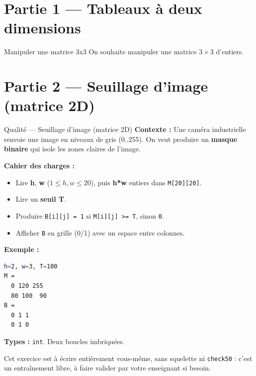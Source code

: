 \section*{Partie 1 — Tableaux à deux dimensions}

\begin{UPSTIexercice}{Manipuler une matrice 3x3}
    On souhaite manipuler une matrice $3 \times 3$ d'entiers.

\end{UPSTIexercice}


\section*{Partie 2 — Seuillage d'image (matrice 2D)}

\begin{UPSTIManipulation}{Qualité — Seuillage d'image (matrice 2D)}
  \textbf{Contexte :} Une caméra industrielle renvoie une image en niveaux de gris (0..255). On veut produire un \textbf{masque binaire} qui isole les zones claires de l'image.

  \textbf{Cahier des charges :}
  \begin{itemize}
    \item Lire \textbf{h}, \textbf{w} ($1\le h,w \le 20$), puis \textbf{h*w} entiers dans \texttt{M[20][20]}.
    \item Lire un \textbf{seuil T}.
    \item Produire \texttt{B[i][j] = 1} si \texttt{M[i][j] >= T}, sinon \texttt{0}.
    \item Afficher \texttt{B} en grille (0/1) avec un espace entre colonnes.
  \end{itemize}

  \textbf{Exemple :}
  \begin{lstlisting}[language=bash]
h=2, w=3, T=100
M =
  0 120 255
  80 100  90
B =
  0 1 1
  0 1 0
  \end{lstlisting}

  \textbf{Types :} \texttt{int}. Deux boucles imbriquées.

  Cet exercice est à écrire entièrement vous-même, sans squelette ni \texttt{check50} : c'est un entraînement libre, à faire valider par votre enseignant si besoin.
\end{UPSTIManipulation}


